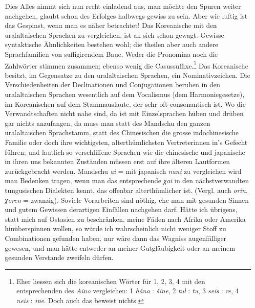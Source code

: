 {Dies Alles nimmt sich nun recht einladend aus, man möchte den Spuren weiter nachgehen, glaubt schon des Erfolges halbwegs gewiss zu sein. Aber wie luftig ist das Gespinst, wenn man es näher betrachtet! Das Koreanische mit den uralaltaischen Sprachen zu vergleichen, ist an sich schon gewagt. Gewisse syntaktische Ähnlichkeiten bestehen wohl; die theilen aber auch andere Sprachfamilien von suffigirendem Baue. Weder die Pronomina noch die Zahlwörter stimmen zusammen; ebenso wenig die Casussuffixe.\footnote{ Eher liessen sich die koreanischen Wörter für 1, 2, 3, 4 mit den entsprechenden des \textit{Aino} vergleichen: 1 \textit{hăna} : \textit{šine}, 2 \textit{tul} : \textit{tu}, 3 \textit{seis} : \textit{re}, 4 \textit{neis} : \textit{ine}. Doch auch das beweist nichts.} Das Koreanische besitzt, im Gegensatze zu den uralaltaischen Sprachen, ein Nominativzeichen. Die Verschiedenheiten der Declinationen und Conjugationen beruhen in den uralaltaischen Sprachen wesentlich auf dem Vocalismus (dem Harmoniegesetze), im Koreanischen auf dem Stammauslaute, der sehr oft consonantisch ist. Wo die Verwandtschaften nicht nahe sind, da ist mit Einzel\-\label{fp.286}sprachen hüben und drüben gar nichts anzufangen, da muss man statt des Mandschu den ganzen uralaltaischen Sprachstamm, statt des Chinesischen die grosse indochinesische Familie oder doch ihre wichtigsten, alterthümlichsten Vertreterinnen in’s Gefecht führen; und lautlich so verschliffene Sprachen wie die chinesische und japanische in ihren uns bekannten Zuständen müssen erst auf ihre älteren Lautformen zurückgebracht werden. Mandschu \textit{ai} =  mit japanisch \textit{nani} zu vergleichen wird man Bedenken tragen, wenn man das entsprechende \textit{χai} in den nächstverwandten tungusischen Dialekten kennt, das offenbar alterthümlicher ist. (Vergl. auch \textit{orin}, \textit{χoren} = zwanzig). Soviele Vorarbeiten sind nöthig, ehe man mit gesunden Sinnen und gutem Gewissen derartigen Einfällen nachgehen darf. Hätte ich übrigens, statt mich auf Ostasien zu beschränken, meine Fäden nach Afrika oder Amerika hinüberspinnen wollen, so würde ich wahrscheinlich nicht weniger Stoff zu Combinationen gefunden haben, nur wäre dann das Wagniss augenfälliger gewesen, und man hätte entweder an meiner Gutgläubigkeit oder an meinem gesunden Verstande zweifeln dürfen.

}

